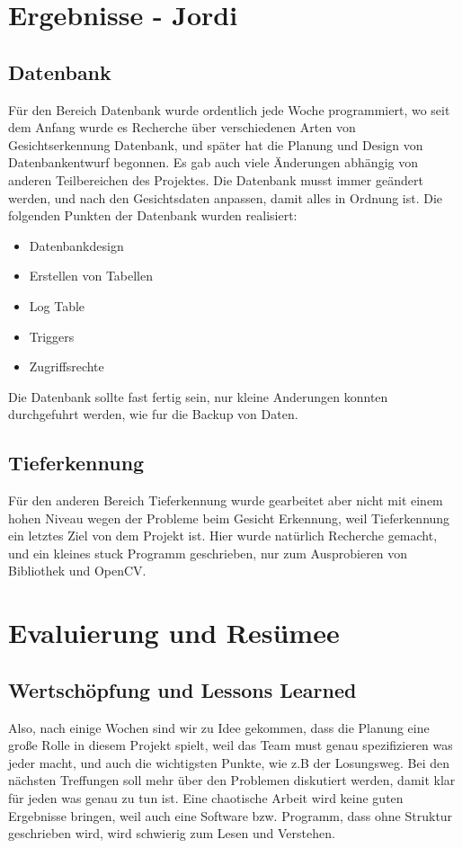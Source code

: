 \chapter{Ergebnisse - Jordi}
\section{Datenbank}
Für den Bereich Datenbank wurde ordentlich jede Woche programmiert, wo seit dem Anfang wurde es Recherche über verschiedenen Arten von Gesichtserkennung Datenbank, und später hat die Planung und Design von Datenbankentwurf begonnen. Es gab auch viele Änderungen abhängig von anderen Teilbereichen des Projektes. Die Datenbank musst immer geändert werden, und nach den Gesichtsdaten anpassen, damit alles in Ordnung ist.
Die folgenden Punkten der Datenbank wurden realisiert:

\begin{itemize}
	\item Datenbankdesign
	\item Erstellen von Tabellen
	\item Log Table
	\item Triggers
	\item Zugriffsrechte
\end{itemize}
Die Datenbank sollte fast fertig sein, nur kleine Anderungen konnten durchgefuhrt werden, wie fur die Backup von Daten.
\section{Tieferkennung}
Für den anderen Bereich Tieferkennung wurde gearbeitet aber nicht mit einem hohen Niveau wegen der Probleme beim Gesicht Erkennung, weil Tieferkennung ein letztes Ziel von dem Projekt ist. Hier wurde natürlich Recherche gemacht, und ein kleines stuck Programm geschrieben, nur zum Ausprobieren von Bibliothek und OpenCV.
\chapter{Evaluierung und Resümee}
\section{Wertschöpfung und Lessons Learned}
Also, nach einige Wochen sind wir zu Idee gekommen, dass die Planung eine große Rolle in diesem Projekt spielt, weil das Team must genau spezifizieren was jeder macht, und auch die wichtigsten Punkte, wie z.B der Losungsweg. Bei den nächsten Treffungen soll mehr über den Problemen diskutiert werden, damit klar für jeden was genau zu tun ist. Eine chaotische Arbeit wird keine guten Ergebnisse bringen, weil auch eine Software bzw. Programm, dass ohne Struktur geschrieben wird, wird schwierig zum Lesen und Verstehen.

